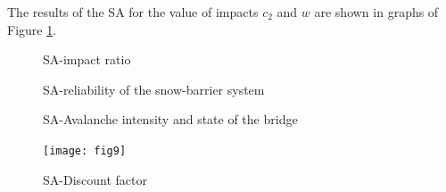 \documentclass[]{article}
\begin{document}
The results of the SA for the value of impacts $c_2$ and $w$ are shown in graphs
of Figure \ref{impactratio}.

\begin{figure}[ht!]
\centering{}  \caption{SA-impact ratio}
\label{impactratio} 
\end{figure}

\begin{figure}[ht!]
\centering{} 
\caption{SA-reliability of the snow-barrier system}
\label{reliabilitySPS} 
\end{figure}

\begin{figure}[ht!]
\centering{}  \caption{SA-Avalanche intensity and state of the bridge}
\label{reliabilitybridge} 
\end{figure}


\begin{figure}[ht!]

\centering{}\texttt{[image: fig9]} %
\caption{SA-Discount factor}
\label{SAdiscount} 
\end{figure}
\end{document}
